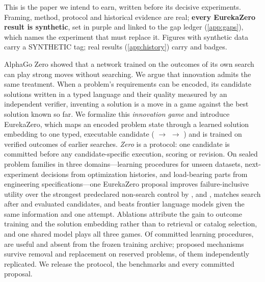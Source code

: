 \begin{ezsynnote}
\enspace This is the paper we intend
to earn, written before its decisive experiments. Framing, method, protocol and historical evidence
are real; \textbf{every EurekaZero result is synthetic}, set in \textcolor{ezsyn}{purple} and linked
to the gap ledger (\cref{app:gaps}), which names the experiment that must replace it. Figures with
synthetic data carry a \textsf{SYNTHETIC} tag; real results (\cref{app:history}) carry \est{} and
\pre{} badges.
\end{ezsynnote}

\begin{ezabstract}
\par\smallskip
\noindent AlphaGo Zero showed that a network trained on the outcomes of its own search can play
strong moves without searching. We argue that innovation admits the same treatment. When a
problem's requirements can be encoded, its candidate solutions written in a typed language and
their quality measured by an independent verifier, inventing a solution is a move in a game against
the best solution known so far. We formalize this \emph{innovation game} and introduce EurekaZero,
which maps an encoded problem state through a learned solution embedding to one typed, executable
candidate ( $\to$  $\to$ ) and
is trained on verified outcomes of earlier searches. \emph{Zero} is a protocol: one candidate is
committed before any candidate-specific execution, scoring or revision. On sealed problem families
in three domains---learning procedures for unseen datasets, next-experiment decisions from
optimization histories, and load-bearing parts from engineering specifications---one EurekaZero
proposal improves failure-inclusive utility over the strongest predeclared non-search control by
\syn[EZ-G01]{\EZdA}, \syn[EZ-G03]{\EZdB} and \syn[EZ-G05]{\EZdC}, matches search after
\syn[EZ-G02]{\EZbeqA} and \syn[EZ-G06]{\EZbeqC} evaluated candidates, and beats frontier language
models given the same information and one attempt. Ablations attribute the gain to outcome training
and the solution embedding rather than to retrieval or catalog selection, and one shared model plays
all three games. Of committed learning procedures, \syn[EZ-G15]{\EZnovAfour\%} are useful and absent
from the frozen training archive; \syn[EZ-G15]{\EZnFive} proposed mechanisms survive removal and
replacement on reserved problems, \syn[EZ-G15]{\EZnSix} of them independently replicated. We release
the protocol, the benchmarks and every committed proposal.
\end{ezabstract}

